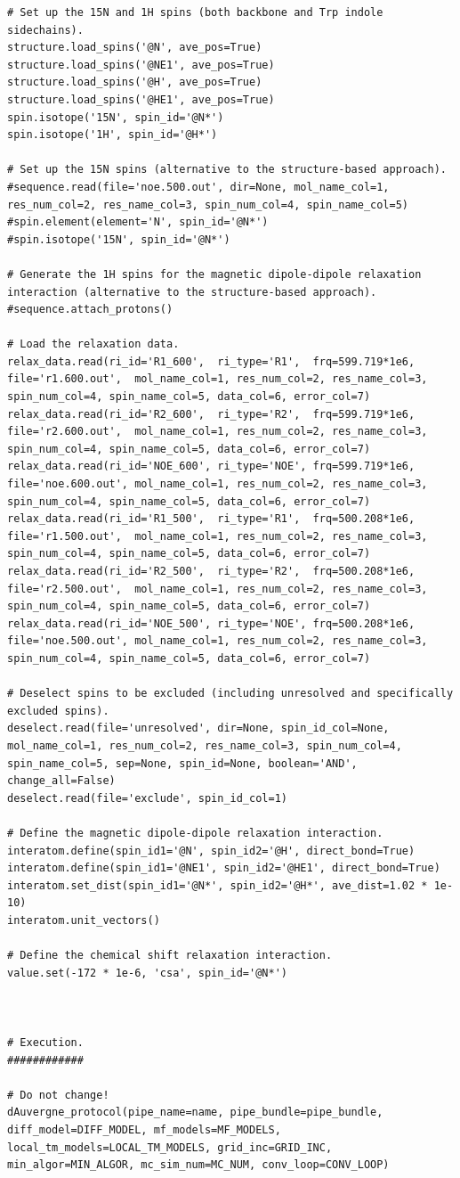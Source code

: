 \begin{lstlisting}
# Set up the 15N and 1H spins (both backbone and Trp indole sidechains).
structure.load_spins('@N', ave_pos=True)
structure.load_spins('@NE1', ave_pos=True)
structure.load_spins('@H', ave_pos=True)
structure.load_spins('@HE1', ave_pos=True)
spin.isotope('15N', spin_id='@N*')
spin.isotope('1H', spin_id='@H*')

# Set up the 15N spins (alternative to the structure-based approach).
#sequence.read(file='noe.500.out', dir=None, mol_name_col=1, res_num_col=2, res_name_col=3, spin_num_col=4, spin_name_col=5)
#spin.element(element='N', spin_id='@N*')
#spin.isotope('15N', spin_id='@N*')

# Generate the 1H spins for the magnetic dipole-dipole relaxation interaction (alternative to the structure-based approach).
#sequence.attach_protons()

# Load the relaxation data.
relax_data.read(ri_id='R1_600',  ri_type='R1',  frq=599.719*1e6, file='r1.600.out',  mol_name_col=1, res_num_col=2, res_name_col=3, spin_num_col=4, spin_name_col=5, data_col=6, error_col=7)
relax_data.read(ri_id='R2_600',  ri_type='R2',  frq=599.719*1e6, file='r2.600.out',  mol_name_col=1, res_num_col=2, res_name_col=3, spin_num_col=4, spin_name_col=5, data_col=6, error_col=7)
relax_data.read(ri_id='NOE_600', ri_type='NOE', frq=599.719*1e6, file='noe.600.out', mol_name_col=1, res_num_col=2, res_name_col=3, spin_num_col=4, spin_name_col=5, data_col=6, error_col=7)
relax_data.read(ri_id='R1_500',  ri_type='R1',  frq=500.208*1e6, file='r1.500.out',  mol_name_col=1, res_num_col=2, res_name_col=3, spin_num_col=4, spin_name_col=5, data_col=6, error_col=7)
relax_data.read(ri_id='R2_500',  ri_type='R2',  frq=500.208*1e6, file='r2.500.out',  mol_name_col=1, res_num_col=2, res_name_col=3, spin_num_col=4, spin_name_col=5, data_col=6, error_col=7)
relax_data.read(ri_id='NOE_500', ri_type='NOE', frq=500.208*1e6, file='noe.500.out', mol_name_col=1, res_num_col=2, res_name_col=3, spin_num_col=4, spin_name_col=5, data_col=6, error_col=7)

# Deselect spins to be excluded (including unresolved and specifically excluded spins).
deselect.read(file='unresolved', dir=None, spin_id_col=None, mol_name_col=1, res_num_col=2, res_name_col=3, spin_num_col=4, spin_name_col=5, sep=None, spin_id=None, boolean='AND', change_all=False)
deselect.read(file='exclude', spin_id_col=1)

# Define the magnetic dipole-dipole relaxation interaction.
interatom.define(spin_id1='@N', spin_id2='@H', direct_bond=True)
interatom.define(spin_id1='@NE1', spin_id2='@HE1', direct_bond=True)
interatom.set_dist(spin_id1='@N*', spin_id2='@H*', ave_dist=1.02 * 1e-10)
interatom.unit_vectors()

# Define the chemical shift relaxation interaction.
value.set(-172 * 1e-6, 'csa', spin_id='@N*')



# Execution.
############

# Do not change!
dAuvergne_protocol(pipe_name=name, pipe_bundle=pipe_bundle, diff_model=DIFF_MODEL, mf_models=MF_MODELS, local_tm_models=LOCAL_TM_MODELS, grid_inc=GRID_INC, min_algor=MIN_ALGOR, mc_sim_num=MC_NUM, conv_loop=CONV_LOOP)
\end{lstlisting}


